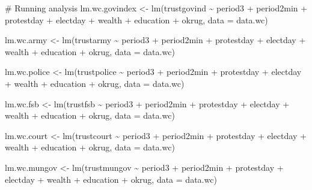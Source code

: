 \documentclass[
  letterpaper,
  DIV=11,
  numbers=noendperiod]{scrartcl}
\newenvironment{Shaded}{\begin{snugshade}}{\end{snugshade}}
\newcommand{\AttributeTok}[1]{\textcolor[rgb]{0.40,0.45,0.13}{#1}}
\newcommand{\CommentTok}[1]{\textcolor[rgb]{0.37,0.37,0.37}{#1}}
\newcommand{\FunctionTok}[1]{\textcolor[rgb]{0.28,0.35,0.67}{#1}}
\newcommand{\NormalTok}[1]{\textcolor[rgb]{0.00,0.23,0.31}{#1}}
\newcommand{\OtherTok}[1]{\textcolor[rgb]{0.00,0.23,0.31}{#1}}
\newcommand{\SpecialCharTok}[1]{\textcolor[rgb]{0.37,0.37,0.37}{#1}}
\begin{document}
\begin{Shaded}
\begin{Highlighting}[]
\CommentTok{\# Running analysis}
\NormalTok{lm.wc.govindex }\OtherTok{\textless{}{-}} \FunctionTok{lm}\NormalTok{(trustgovind }\SpecialCharTok{\textasciitilde{}}\NormalTok{ period3 }\SpecialCharTok{+}\NormalTok{ period2min }\SpecialCharTok{+}\NormalTok{ protestday }\SpecialCharTok{+}\NormalTok{ electday }\SpecialCharTok{+}
\NormalTok{                       wealth }\SpecialCharTok{+}\NormalTok{ education }\SpecialCharTok{+}\NormalTok{ okrug, }\AttributeTok{data =}\NormalTok{ data.wc) }

\NormalTok{lm.wc.army }\OtherTok{\textless{}{-}} \FunctionTok{lm}\NormalTok{(trustarmy }\SpecialCharTok{\textasciitilde{}}\NormalTok{ period3 }\SpecialCharTok{+}\NormalTok{ period2min }\SpecialCharTok{+}\NormalTok{ protestday }\SpecialCharTok{+}\NormalTok{ electday }\SpecialCharTok{+}
\NormalTok{                   wealth }\SpecialCharTok{+}\NormalTok{ education }\SpecialCharTok{+}\NormalTok{ okrug, }\AttributeTok{data =}\NormalTok{ data.wc) }

\NormalTok{lm.wc.police }\OtherTok{\textless{}{-}} \FunctionTok{lm}\NormalTok{(trustpolice }\SpecialCharTok{\textasciitilde{}}\NormalTok{ period3 }\SpecialCharTok{+}\NormalTok{ period2min }\SpecialCharTok{+}\NormalTok{ protestday }\SpecialCharTok{+}\NormalTok{ electday }\SpecialCharTok{+}
\NormalTok{                     wealth }\SpecialCharTok{+}\NormalTok{ education }\SpecialCharTok{+}\NormalTok{ okrug, }\AttributeTok{data =}\NormalTok{ data.wc) }

\NormalTok{lm.wc.fsb }\OtherTok{\textless{}{-}} \FunctionTok{lm}\NormalTok{(trustfsb }\SpecialCharTok{\textasciitilde{}}\NormalTok{ period3 }\SpecialCharTok{+}\NormalTok{ period2min }\SpecialCharTok{+}\NormalTok{ protestday }\SpecialCharTok{+}\NormalTok{ electday }\SpecialCharTok{+}
\NormalTok{                  wealth }\SpecialCharTok{+}\NormalTok{ education }\SpecialCharTok{+}\NormalTok{ okrug, }\AttributeTok{data =}\NormalTok{ data.wc) }

\NormalTok{lm.wc.court }\OtherTok{\textless{}{-}} \FunctionTok{lm}\NormalTok{(trustcourt }\SpecialCharTok{\textasciitilde{}}\NormalTok{ period3 }\SpecialCharTok{+}\NormalTok{ period2min }\SpecialCharTok{+}\NormalTok{ protestday }\SpecialCharTok{+}\NormalTok{ electday }\SpecialCharTok{+}
\NormalTok{                    wealth }\SpecialCharTok{+}\NormalTok{ education }\SpecialCharTok{+}\NormalTok{ okrug, }\AttributeTok{data =}\NormalTok{ data.wc) }

\NormalTok{lm.wc.mungov }\OtherTok{\textless{}{-}} \FunctionTok{lm}\NormalTok{(trustmungov }\SpecialCharTok{\textasciitilde{}}\NormalTok{ period3 }\SpecialCharTok{+}\NormalTok{ period2min }\SpecialCharTok{+}\NormalTok{ protestday }\SpecialCharTok{+}\NormalTok{ electday }\SpecialCharTok{+}
\NormalTok{                     wealth }\SpecialCharTok{+}\NormalTok{ education }\SpecialCharTok{+}\NormalTok{ okrug, }\AttributeTok{data =}\NormalTok{ data.wc) }


\end{Highlighting}
\end{Shaded}
\end{document}
